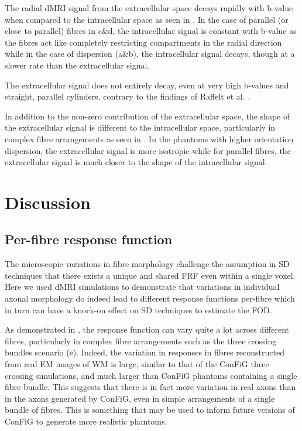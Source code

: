 The radial \ac{dMRI} signal from the extracellular space decays rapidly with b-value when compared to the intracellular space as seen in .
In the case of parallel (or close to parallel) fibres in c\&d, the intracellular signal is constant with b-value as the fibres act like completely restricting compartments in the radial direction while in the case of dispersion (a\&b), the intracellular signal decays, though at a slower rate than the extracellular signal.

The extracellular signal does not entirely decay, even at very high b-values and straight, parallel cylinders, contrary to the findings of Raffelt et al. \cite{Raffelt2012}.

In addition to the non-zero contribution of the extracellular space, the shape of the extracellular signal is different to the intracellular space, particularly in complex fibre arrangements as seen in .
In the phantoms with higher orientation dispersion, the extracellular signal is more isotropic while for parallel fibres, the extracellular signal is much closer to the shape of the intracellular signal.

\section{Discussion}
\label{sec:frf_discussion}

\subsection{Per-fibre response function}
\label{sec:frf_discussion_perfibre}
The microscopic variations in fibre morphology challenge the assumption in \acl{SD} techniques that there exists a unique and shared \acl{FRF} even within a single voxel.
Here we used \ac{dMRI} simulations to demonstrate that variations in individual axonal morphology do indeed lead to different response functions per-fibre which in turn can have a knock-on effect on \ac{SD} techniques to estimate the \acl{FOD}.

As demonstrated in , the response function can vary quite a lot across different fibres, particularly in complex fibre arrangements such as the three crossing bundles scenario (e).
Indeed, the variation in responses in fibres reconstructed from real \ac{EM} images of \acl{WM} is large, similar to that of the ConFiG three crossing simulations, and much larger than \ac{ConFiG} phantoms containing a single fibre bundle.
This suggests that there is in fact more variation in real axons than in the axons generated by \ac{ConFiG}, even in simple arrangements of a single bundle of fibres. This is something that may be used to inform future versions of \ac{ConFiG} to generate more realistic phantoms.

